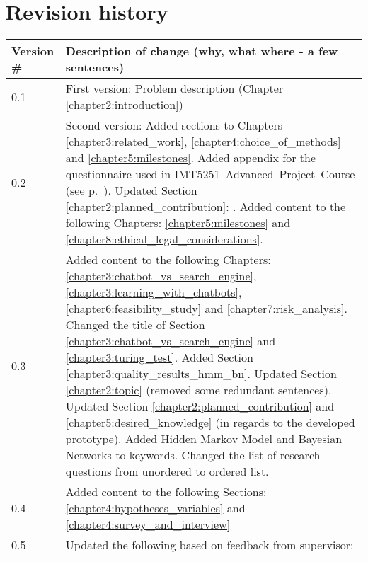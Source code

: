 \chapter*{Revision history}

\begin{center}
	\begin{tabular}[H]{|l|p{35em}|}
		\hline
		Version \#  & Description of change (why, what where - a few sentences)\\
		\hline
		0.1   & First version: Problem description (Chapter \ref{chapter2:introduction})\\
		\hline
		0.2   & Second version: Added sections to Chapters \ref{chapter3:related_work}, \ref{chapter4:choice_of_methods} and \ref{chapter5:milestones}. 
		\newline  
		Added appendix for the questionnaire used in \newline IMT5251~Advanced~Project~Course (see p.~\pageref{appendix:questionnaire}).
		\newline  
		Updated Section \ref{chapter2:planned_contribution}: \nameref{chapter2:planned_contribution}.
		\newline  
		Added content to the following Chapters: \ref{chapter5:milestones} and \ref{chapter8:ethical_legal_considerations}. \\
		\hline
		0.3   & Added content to the following Chapters: \ref{chapter3:chatbot_vs_search_engine}, \ref{chapter3:learning_with_chatbots}, 
		\ref{chapter6:feasibility_study} and \ref{chapter7:risk_analysis}. \newline
		Changed the title of Section \ref{chapter3:chatbot_vs_search_engine} and \ref{chapter3:turing_test}. 
		Added Section \ref{chapter3:quality_results_hmm_bn}. \newline
		Updated Section \ref{chapter2:topic} (removed some redundant sentences). \newline
		Updated Section \ref{chapter2:planned_contribution} and \ref{chapter5:desired_knowledge} (in regards to the developed prototype). \newline
		Added Hidden Markov Model and Bayesian Networks to keywords. \newline
		Changed the list of research questions from unordered to ordered list.	\\
		\hline
		0.4   & Added content to the following Sections: \ref{chapter4:hypotheses_variables} and \ref{chapter4:survey_and_interview} \\
		\hline
		0.5   & Updated the following based on feedback from supervisor: \newline 

\end{tabular}
\end{center}
